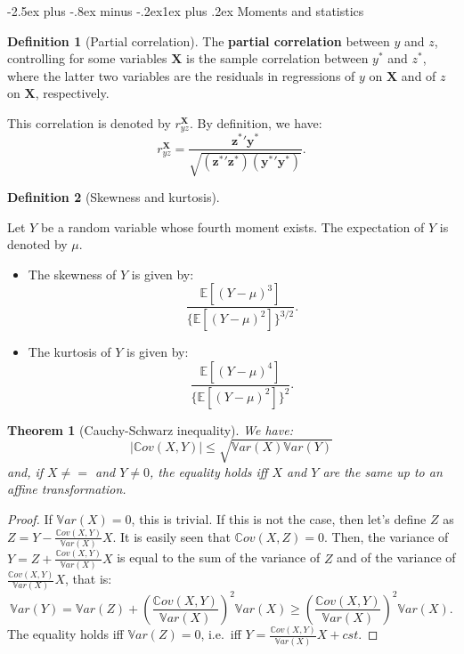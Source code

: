 \documentclass[
  11pt,
]{book}
\makeatletter
\providecommand{\tightlist}{%
  \setlength{\itemsep}{0pt}\setlength{\parskip}{0pt}}
\renewcommand\subsection{\@startsection{subsection}{2}{\z@}
  {-2.5ex plus -.8ex minus -.2ex}{1ex plus .2ex}
  {\normalfont\large\bfseries\color{TextbookInk}}}
\newtheorem{theorem}{Theorem}[chapter]
\theoremstyle{definition}
\newtheorem{definition}{Definition}[chapter]
\theoremstyle{definition}
\theoremstyle{definition}
\theoremstyle{definition}
\theoremstyle{remark}
\makeatother
\begin{document}
\subsection{Moments and statistics}\label{moments-and-statistics}

\begin{definition}[Partial correlation]
\protect\hypertarget{def:partialcorrel}{}\label{def:partialcorrel}The \textbf{partial correlation} between \(y\) and \(z\), controlling for some variables \(\mathbf{X}\) is the sample correlation between \(y^*\) and \(z^*\), where the latter two variables are the residuals in regressions of \(y\) on \(\mathbf{X}\) and of \(z\) on \(\mathbf{X}\), respectively.

This correlation is denoted by \(r_{yz}^\mathbf{X}\). By definition, we have:
\begin{equation}
r_{yz}^\mathbf{X} = \frac{\mathbf{z^*}'\mathbf{y^*}}{\sqrt{(\mathbf{z^*}'\mathbf{z^*})(\mathbf{y^*}'\mathbf{y^*})}}.\label{eq:pc}
\end{equation}
\end{definition}

\begin{definition}[Skewness and kurtosis]
\protect\hypertarget{def:skewnesskurtosis}{}\label{def:skewnesskurtosis}

Let \(Y\) be a random variable whose fourth moment exists. The expectation of \(Y\) is denoted by \(\mu\).

\begin{itemize}
\tightlist
\item
  The skewness of \(Y\) is given by:
  \[
  \frac{\mathbb{E}[(Y-\mu)^3]}{\{\mathbb{E}[(Y-\mu)^2]\}^{3/2}}.
  \]
\item
  The kurtosis of \(Y\) is given by:
  \[
  \frac{\mathbb{E}[(Y-\mu)^4]}{\{\mathbb{E}[(Y-\mu)^2]\}^{2}}.
  \]
\end{itemize}

\end{definition}

\begin{theorem}[Cauchy-Schwarz inequality]
\protect\hypertarget{thm:CauchySchwarz}{}\label{thm:CauchySchwarz}We have:
\[
|\mathbb{C}ov(X,Y)| \le \sqrt{\mathbb{V}ar(X)\mathbb{V}ar(Y)}
\]
and, if \(X \ne =\) and \(Y \ne 0\), the equality holds iff \(X\) and \(Y\) are the same up to an affine transformation.
\end{theorem}

\begin{proof}
If \(\mathbb{V}ar(X)=0\), this is trivial. If this is not the case, then let's define \(Z\) as \(Z = Y - \frac{\mathbb{C}ov(X,Y)}{\mathbb{V}ar(X)}X\). It is easily seen that \(\mathbb{C}ov(X,Z)=0\). Then, the variance of \(Y=Z+\frac{\mathbb{C}ov(X,Y)}{\mathbb{V}ar(X)}X\) is equal to the sum of the variance of \(Z\) and of the variance of \(\frac{\mathbb{C}ov(X,Y)}{\mathbb{V}ar(X)}X\), that is:
\[
\mathbb{V}ar(Y) = \mathbb{V}ar(Z) + \left(\frac{\mathbb{C}ov(X,Y)}{\mathbb{V}ar(X)}\right)^2\mathbb{V}ar(X) \ge \left(\frac{\mathbb{C}ov(X,Y)}{\mathbb{V}ar(X)}\right)^2\mathbb{V}ar(X).
\]
The equality holds iff \(\mathbb{V}ar(Z)=0\), i.e.~iff \(Y = \frac{\mathbb{C}ov(X,Y)}{\mathbb{V}ar(X)}X+cst\).
\end{proof}
\end{document}
